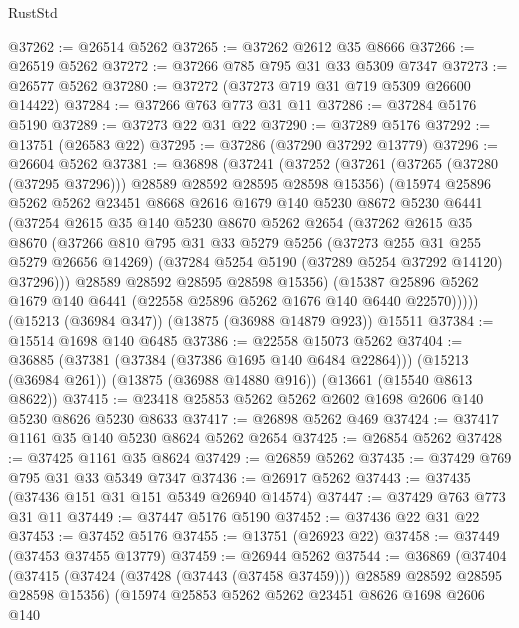\begin{lexlean}{RustStd}
\begin{coremodule}
@37262 := @26514 @5262
@37265 := @37262 @2612 @35 @8666
@37266 := @26519 @5262
@37272 := @37266 @785 @795 @31 @33 @5309 @7347
@37273 := @26577 @5262
@37280 := @37272 (@37273 @719 @31 @719 @5309 @26600 @14422)
@37284 := @37266 @763 @773 @31 @11
@37286 := @37284 @5176 @5190
@37289 := @37273 @22 @31 @22
@37290 := @37289 @5176
@37292 := @13751 (@26583 @22)
@37295 := @37286 (@37290 @37292 @13779)
@37296 := @26604 @5262
@37381 := @36898
    (@37241
      (@37252
        (@37261 (@37265 (@37280 (@37295 @37296))) @28589 @28592 @28595 @28598 @15356)
        (@15974
          @25896
          @5262
          @5262
          @23451
          @8668
          @2616
          @1679
          @140
          @5230
          @8672
          @5230
          @6441
          (@37254
            @2615
            @35
            @140
            @5230
            @8670
            @5262
            @2654
            (@37262
              @2615
              @35
              @8670
              (@37266
                @810
                @795
                @31
                @33
                @5279
                @5256
                (@37273 @255 @31 @255 @5279 @26656 @14269)
                (@37284 @5254 @5190 (@37289 @5254 @37292 @14120) @37296)))
            @28589
            @28592
            @28595
            @28598
            @15356)
          (@15387 @25896 @5262 @1679 @140 @6441 (@22558 @25896 @5262 @1676 @140 @6440 @22570)))))
    (@15213 (@36984 @347))
    (@13875 (@36988 @14879 @923))
    @15511
@37384 := @15514 @1698 @140 @6485
@37386 := @22558 @15073 @5262
@37404 := @36885
    (@37381 (@37384 (@37386 @1695 @140 @6484 @22864)))
    (@15213 (@36984 @261))
    (@13875 (@36988 @14880 @916))
    (@13661 (@15540 @8613 @8622))
@37415 := @23418 @25853 @5262 @5262 @2602 @1698 @2606 @140 @5230 @8626 @5230 @8633
@37417 := @26898 @5262 @469
@37424 := @37417 @1161 @35 @140 @5230 @8624 @5262 @2654
@37425 := @26854 @5262
@37428 := @37425 @1161 @35 @8624
@37429 := @26859 @5262
@37435 := @37429 @769 @795 @31 @33 @5349 @7347
@37436 := @26917 @5262
@37443 := @37435 (@37436 @151 @31 @151 @5349 @26940 @14574)
@37447 := @37429 @763 @773 @31 @11
@37449 := @37447 @5176 @5190
@37452 := @37436 @22 @31 @22
@37453 := @37452 @5176
@37455 := @13751 (@26923 @22)
@37458 := @37449 (@37453 @37455 @13779)
@37459 := @26944 @5262
@37544 := @36869
    (@37404
      (@37415
        (@37424 (@37428 (@37443 (@37458 @37459))) @28589 @28592 @28595 @28598 @15356)
        (@15974
          @25853
          @5262
          @5262
          @23451
          @8626
          @1698
          @2606
          @140

\end{coremodule}
\end{lexlean}
